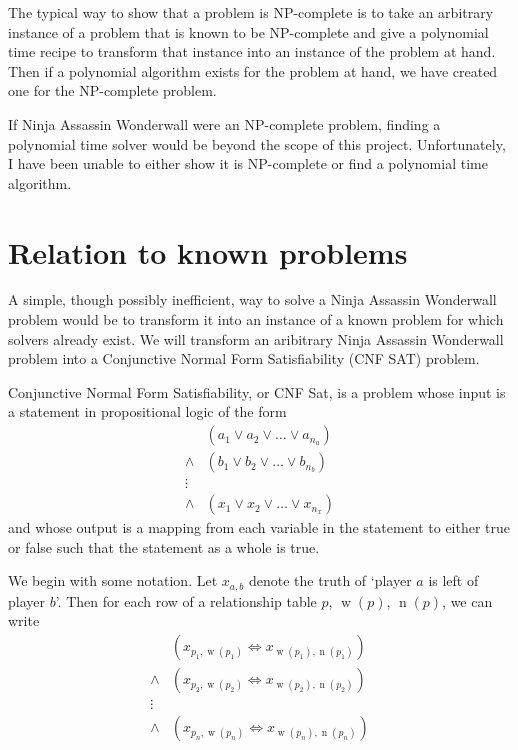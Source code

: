 \documentclass[12pt,x11names, rgb]{article}
\DeclareMathOperator{\w}{w}
\DeclareMathOperator{\n}{n}
\begin{document}
    The typical way to show that a problem is NP-complete is to take an arbitrary instance of a problem that is known to be NP-complete and give a polynomial time recipe to transform that instance into an instance of the problem at hand. Then if a polynomial algorithm exists for the problem at hand, we have created one for the NP-complete problem. 

    If Ninja Assassin Wonderwall were an NP-complete problem, finding a polynomial time solver would be beyond the scope of this project. Unfortunately, I have been unable to either show it is NP-complete or find a polynomial time algorithm. 

\section{Relation to known problems}
    A simple, though possibly inefficient, way to solve a Ninja Assassin Wonderwall problem would be to transform it into an instance of a known problem for which solvers already exist. We will transform an aribitrary Ninja Assassin Wonderwall problem into a Conjunctive Normal Form Satisfiability (CNF SAT) problem.

    Conjunctive Normal Form Satisfiability, or CNF Sat, is a problem whose input is a statement in propositional logic of the form
        \begin{align*} 
                    & (a_1 \vee a_2 \vee \ldots \vee a_{n_a}) \\
            \wedge  & (b_1 \vee b_2 \vee \ldots \vee b_{n_b})\\
            \vdots  &\\
            \wedge  & (x_1 \vee x_2 \vee \ldots \vee x_{n_x})
        \end{align*}
    and whose output is a mapping from each variable in the statement to either true or false such that the statement as a whole is true. 

    We begin with some notation. Let $x_{a,b}$ denote the truth of `player $a$ is left of player $b$'. Then for each row of a relationship table $p$, $\w(p)$, $\n(p)$, we can write
        \begin{align*}
                    & (x_{p_1, \w(p_1)} \Leftrightarrow x_{\w(p_1), \n(p_1)})\\
            \wedge  & (x_{p_2, \w(p_2)} \Leftrightarrow x_{\w(p_2), \n(p_2)})\\
            \vdots  &\\
            \wedge  & (x_{p_n, \w(p_n)} \Leftrightarrow x_{\w(p_n), \n(p_n)})
        \end{align*}
\end{document}
